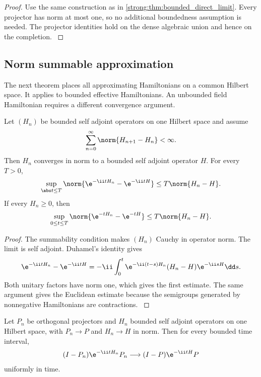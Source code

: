 \begin{proof}\label{strong:proof:074}
Use the same construction as in \cref{strong:thm:bounded_direct_limit}. Every projector has norm at most one, so no additional boundedness assumption is needed. The projector identities hold on the dense algebraic union and hence on the completion.
\label{strong:proof:074:end}\end{proof}

\subsection{Norm summable approximation}\label{strong:subsec:norm_summable}

The next theorem places all approximating Hamiltonians on a common Hilbert space. It applies to bounded effective Hamiltonians. An unbounded field Hamiltonian requires a different convergence argument.

\begin{theorem}\label{strong:theorem:047}\label{strong:thm:norm_summable_tower}
Let \((H_n)\) be bounded self adjoint operators on one Hilbert space and assume
\[
\sum_{n=0}^{\infty}\norm{H_{n+1}-H_n}<\infty.
\]
Then \(H_n\) converges in norm to a bounded self adjoint operator \(H\). For every \(T>0\),
\[
\sup_{\abs t\leq T}
\norm{\e^{-\ii tH_n}-\e^{-\ii tH}}
\leq
T\norm{H_n-H}.
\]
If every \(H_n\geq0\), then
\[
\sup_{0\leq t\leq T}
\norm{\e^{-tH_n}-\e^{-tH}}
\leq
T\norm{H_n-H}.
\]
\end{theorem}

\begin{proof}\label{strong:proof:075}
The summability condition makes \((H_n)\) Cauchy in operator norm. The limit is self adjoint. Duhamel's identity gives
\[
\e^{-\ii tH_n}-\e^{-\ii tH}
=-\ii\int_0^t
\e^{-\ii(t-s)H_n}(H_n-H)\e^{-\ii sH}\dd s.
\]
Both unitary factors have norm one, which gives the first estimate. The same argument gives the Euclidean estimate because the semigroups generated by nonnegative Hamiltonians are contractions.
\label{strong:proof:075:end}\end{proof}

\begin{corollary}\label{strong:corollary:016}\label{strong:cor:limit_leakage}
Let \(P_n\) be orthogonal projectors and \(H_n\) bounded self adjoint operators on one Hilbert space, with \(P_n\to P\) and \(H_n\to H\) in norm. Then for every bounded time interval,
\[
(I-P_n)\e^{-\ii tH_n}P_n
\longrightarrow
(I-P)\e^{-\ii tH}P
\]
uniformly in time.
\end{corollary}


